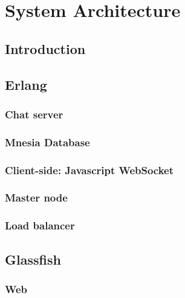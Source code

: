 \chapter{System Architecture}

\section{Introduction}



\section{Erlang}



\subsection{Chat server}



\subsection{Mnesia Database}
\label{subsec:erlang-mnesia}



\subsection{Client-side: Javascript WebSocket}


\subsection{Master node}



\subsection{Load balancer}



\section{Glassfish}


\subsection{Web}


